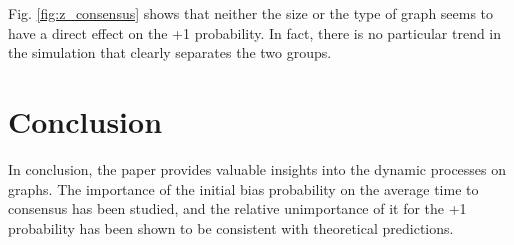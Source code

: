 \documentclass[conference]{IEEEtran}
\begin{document}
        Fig. \ref{fig:z_consensus} shows that neither the size or the type of graph seems to have a direct effect on the +1 probability. In fact, there is no particular trend in the simulation that clearly separates the two groups. 

    
\section{Conclusion}

    In conclusion, the paper provides valuable insights into the dynamic processes on graphs. The importance of the initial bias probability on the average time to consensus has been studied, and the relative unimportance of it for the +1 probability has been shown to be consistent with theoretical predictions. 

%
%
\end{document}
